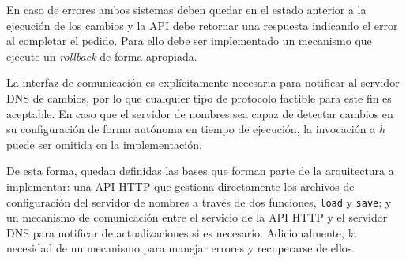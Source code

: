 En caso de errores ambos sistemas deben quedar en el estado anterior a la ejecución de los cambios y la API debe retornar una respuesta indicando el error al completar el pedido. Para ello debe ser implementado un mecanismo que ejecute un \textit{rollback} de forma apropiada.

La interfaz de comunicación es explícitamente necesaria para notificar al servidor DNS de cambios, por lo que cualquier tipo de protocolo factible para este fin es aceptable. En caso que el servidor de nombres sea capaz de detectar cambios en su configuración de forma autónoma en tiempo de ejecución, la invocación a $h$ puede ser omitida en la implementación.

De esta forma, quedan definidas las bases que forman parte de la arquitectura a implementar: una API HTTP que gestiona directamente los archivos de configuración del servidor de nombres a través de dos funciones, \verb|load| y \verb|save|; y un mecanismo de comunicación entre el servicio de la API HTTP y el servidor DNS para notificar de actualizaciones si es necesario. Adicionalmente, la necesidad de un mecanismo para manejar errores y recuperarse de ellos.
